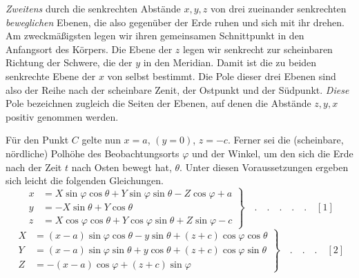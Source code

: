 \textit{Zweitens} durch die senkrechten Abstände $x,y,z$ von drei zueinander senkrechten \textit{beweglichen} Ebenen, die also gegenüber der Erde ruhen und sich mit ihr drehen. Am zweckmäßigsten legen wir ihren gemeinsamen Schnittpunkt in den Anfangsort des Körpers. Die Ebene der $z$ legen wir senkrecht zur scheinbaren Richtung der Schwere, die der $y$ in den Meridian. Damit ist die zu beiden senkrechte Ebene der $x$ von selbst bestimmt. Die Pole dieser drei Ebenen sind also der Reihe nach der scheinbare Zenit, der Ostpunkt und der Südpunkt. \textit{Diese} Pole bezeichnen zugleich die Seiten der Ebenen, auf denen die Abstände $z,y,x$ positiv genommen werden.

Für den Punkt $C$ gelte nun $x=a$, $(y=0)$, $z=-c$. Ferner sei die (scheinbare, nördliche) Polhöhe des Beobachtungsorts $\varphi$ und der Winkel, um den sich die Erde nach der Zeit $t$ nach Osten bewegt hat, $\theta$. Unter diesen Voraussetzungen ergeben sich leicht die folgenden Gleichungen.
\[
\left.\begin{aligned}
x&=X\sin\varphi\cos\theta+Y\sin\varphi\sin\theta-Z\cos\varphi+a\\
y&=-X\sin\theta+Y\cos\theta\\
z&=X\cos\varphi\cos\theta+Y\cos\varphi\sin\theta+Z\sin\varphi-c
\end{aligned}\right\}\quad.\quad.\quad.\quad.\quad.\quad[1]
\]
\[
\left.\begin{aligned}
X&=(x-a)\sin\varphi\cos\theta-y\sin\theta+(z+c)\cos\varphi\cos\theta\\
Y&=(x-a)\sin\varphi\sin\theta+y\cos\theta+(z+c)\cos\varphi\sin\theta\\
Z&=-(x-a)\cos\varphi+(z+c)\sin\varphi
\end{aligned}\right\}\quad.\quad.\quad.\quad[2]
\]

